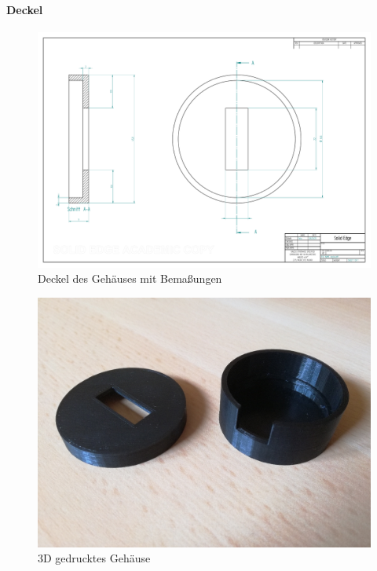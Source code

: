 \documentclass[a4paper,
DIV=13,
12pt,
BCOR=10mm,
department=FakEI,
parskip=half,
automark,
]{article}
\begin{document}
\paragraph{Deckel} 




\begin{figure}[!hbpt]
 \begin{center} \includegraphics[width=1.4\textwidth,angle=-90]{Deckel.pdf}
 \caption{Deckel des Gehäuses mit Bemaßungen}
 \label{fig:Deckel}
  \end{center}
\end{figure}

\begin{figure}[!hbpt]
 \begin{center} \includegraphics[width=1\textwidth]{Gehauuse_Stimmungslicht.jpg}
 \caption{3D gedrucktes Gehäuse}
 \label{fig:Register}
  \end{center}
\end{figure}
\end{document}
